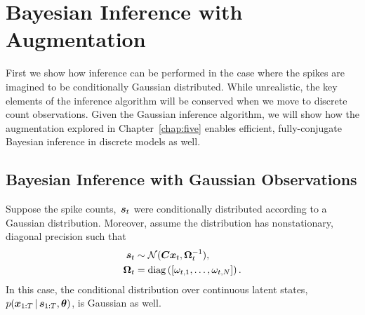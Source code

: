 \section{Bayesian Inference with \polyagamma Augmentation}

First we show how inference can be performed in the case where
the spikes are imagined to be conditionally Gaussian distributed.
While unrealistic, the key elements of the inference algorithm
will be conserved when we move to discrete count observations.
Given the Gaussian inference algorithm, we will show how the \polyagamma
augmentation explored in Chapter~\ref{chap:five} enables efficient,
fully-conjugate Bayesian inference in discrete models as well.


\subsection{Bayesian Inference with Gaussian Observations}
Suppose the spike counts,~$\boldsymbol{s}_t$ were conditionally distributed
according to a Gaussian distribution. Moreover, assume the
distribution has nonstationary, diagonal precision such that
\begin{align}
  \label{eq:gauss_lkhd}
  \boldsymbol{s}_{t} &\sim \mathcal{N}(\boldsymbol{C} \boldsymbol{x}_t, \boldsymbol{\Omega}_t^{-1}), \\
  \nonumber
  \boldsymbol{\Omega}_t &= \mathrm{diag}\left( \left[ \omega_{t,1}, \ldots, \omega_{t,N} \right] \right).
\end{align}
In this case, the conditional distribution over continuous latent
states,~$p(\boldsymbol{x}_{1:T} \,|\, \boldsymbol{s}_{1:T}, \boldsymbol{\theta})$, is Gaussian as well.

